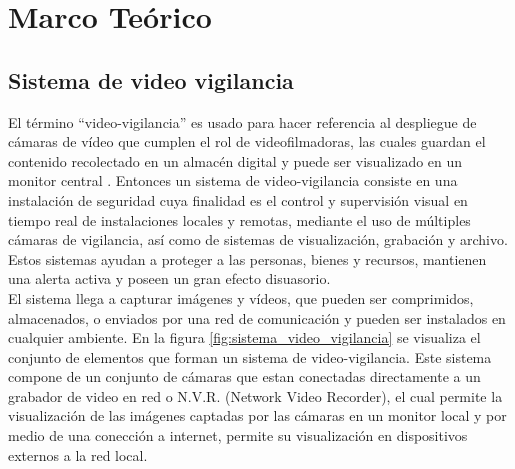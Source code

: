
\chapter{Marco Teórico}

\section{Sistema de video vigilancia}
El término ``video-vigilancia'' es usado para hacer referencia al despliegue de cámaras de vídeo que cumplen el rol de videofilmadoras, las cuales guardan el contenido recolectado en un almacén digital y puede ser visualizado en un monitor central \cite{wikipedia:vvigilancia}. Entonces un sistema de video-vigilancia consiste en una instalación de seguridad cuya finalidad es el control y supervisión visual en tiempo real de instalaciones locales y remotas, mediante el uso de múltiples cámaras de vigilancia, así como de sistemas de visualización, grabación y archivo. Estos sistemas ayudan a proteger a las personas, bienes y recursos, mantienen una alerta activa y poseen un gran efecto disuasorio.\\

El sistema llega a capturar imágenes y vídeos, que pueden ser comprimidos, almacenados, o enviados por una red de comunicación y pueden ser instalados en cualquier ambiente. En la figura \ref{fig:sistema_video_vigilancia} se visualiza el conjunto de elementos que forman un sistema de video-vigilancia. Este sistema compone de un conjunto de cámaras que estan conectadas directamente a un grabador de video en red o N.V.R. (Network Video Recorder), el cual permite la visualización de las imágenes captadas por las cámaras en un monitor local y por medio de una conección a internet, permite su visualización en dispositivos externos a la red local.\\

